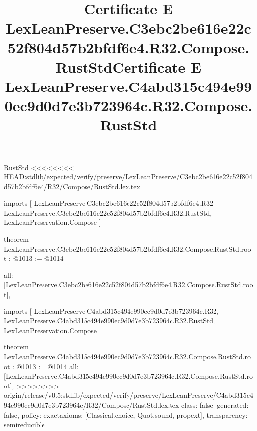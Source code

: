 \begin{lexlean}{RustStd}
<<<<<<<< HEAD:stdlib/expected/verify/preserve/LexLeanPreserve/C3ebc2be616e22c52f804d57b2bfdf6e4/R32/Compose/RustStd.lex.tex
\title{Certificate E LexLeanPreserve.C3ebc2be616e22c52f804d57b2bfdf6e4.R32.Compose.RustStd}
\begin{coremodule}
imports [
  LexLeanPreserve.C3ebc2be616e22c52f804d57b2bfdf6e4.R32,
  LexLeanPreserve.C3ebc2be616e22c52f804d57b2bfdf6e4.R32.RustStd,
  LexLeanPreservation.Compose
]

theorem LexLeanPreserve.C3ebc2be616e22c52f804d57b2bfdf6e4.R32.Compose.RustStd.root : @1013 := @1014 {
  all: [LexLeanPreserve.C3ebc2be616e22c52f804d57b2bfdf6e4.R32.Compose.RustStd.root],
========
\title{Certificate E LexLeanPreserve.C4abd315c494e990ec9d0d7e3b723964c.R32.Compose.RustStd}
\begin{coremodule}
imports [
  LexLeanPreserve.C4abd315c494e990ec9d0d7e3b723964c.R32,
  LexLeanPreserve.C4abd315c494e990ec9d0d7e3b723964c.R32.RustStd,
  LexLeanPreservation.Compose
]

theorem LexLeanPreserve.C4abd315c494e990ec9d0d7e3b723964c.R32.Compose.RustStd.root : @1013 := @1014 {
  all: [LexLeanPreserve.C4abd315c494e990ec9d0d7e3b723964c.R32.Compose.RustStd.root],
>>>>>>>> origin/release/v0.5:stdlib/expected/verify/preserve/LexLeanPreserve/C4abd315c494e990ec9d0d7e3b723964c/R32/Compose/RustStd.lex.tex
  class: false,
  generated: false,
  policy: exact{axioms: [Classical.choice, Quot.sound, propext]},
  transparency: semireducible
}


\end{coremodule}}
\end{coremodule}
\end{lexlean}
